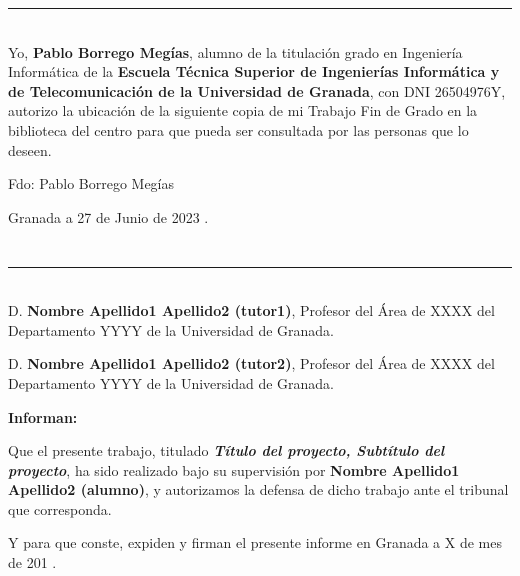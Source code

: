 \noindent\rule[-1ex]{\textwidth}{2pt}\\[4.5ex]

Yo, \textbf{Pablo Borrego Megías}, alumno de la titulación grado en Ingeniería Informática de la \textbf{Escuela Técnica Superior
de Ingenierías Informática y de Telecomunicación de la Universidad de Granada}, con DNI 26504976Y, autorizo la
ubicación de la siguiente copia de mi Trabajo Fin de Grado en la biblioteca del centro para que pueda ser
consultada por las personas que lo deseen.

\vspace{6cm}

\noindent Fdo: Pablo Borrego Megías

\vspace{2cm}

\begin{flushright}
Granada a 27 de Junio de 2023 .
\end{flushright}


\chapter*{}
\thispagestyle{empty}

\noindent\rule[-1ex]{\textwidth}{2pt}\\[4.5ex]

D. \textbf{Nombre Apellido1 Apellido2 (tutor1)}, Profesor del Área de XXXX del Departamento YYYY de la Universidad de Granada.

\vspace{0.5cm}

D. \textbf{Nombre Apellido1 Apellido2 (tutor2)}, Profesor del Área de XXXX del Departamento YYYY de la Universidad de Granada.


\vspace{0.5cm}

\textbf{Informan:}

\vspace{0.5cm}

Que el presente trabajo, titulado \textit{\textbf{Título del proyecto, Subtítulo del proyecto}},
ha sido realizado bajo su supervisión por \textbf{Nombre Apellido1 Apellido2 (alumno)}, y autorizamos la defensa de dicho trabajo ante el tribunal
que corresponda.

\vspace{0.5cm}

Y para que conste, expiden y firman el presente informe en Granada a X de mes de 201 .

\vspace{1cm}

